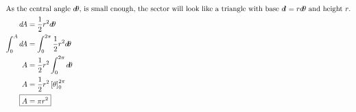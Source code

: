 \begin{enumerate}
\begin{solution}
        \begin{multicols}{2}
            \begin{align*}
                \intertext{As the central angle $d\!\theta$, is small enough, the sector will look like a triangle with base $d\!l=r d\!\theta$ and height $r$.}
                d\!A &= \frac{1}{2} r^2 d\!\theta\\
                \int_0^A d\!A &= \int_0^{2\pi} \frac{1}{2} r^2 d\!\theta\\
                A &= \frac{1}{2} r^2 \int_0^{2\pi} d\!\theta\\
                A &= \frac{1}{2} r^2 \left[\theta\right]_0^{2\pi}\\
                \Aboxed{A &= \pi r^2}
            \end{align*}
            \begin{center}
            \end{center}
        \end{multicols}
    \end{solution}


\end{enumerate}
